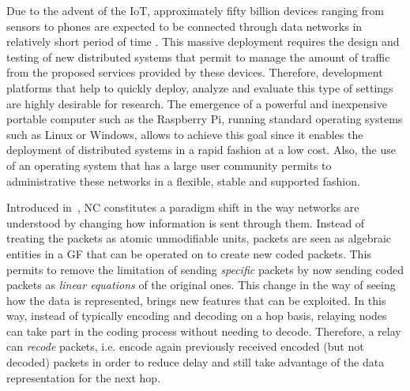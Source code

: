 %

Due to the advent of the \ac{IoT}, approximately fifty billion devices
ranging from sensors to phones are expected to be connected through
data networks in relatively short period of time \cite{cisco2011forecast}.
This massive deployment requires the design and testing of new
distributed systems that permit to manage the amount of traffic
from the proposed services provided by these devices. Therefore,
development platforms that help to quickly deploy, analyze and
evaluate this type of settings are highly desirable for research.
The emergence of a powerful and inexpensive portable computer such
as the Raspberry Pi, running standard operating systems such as
Linux or Windows, allows to achieve this goal since it enables the
deployment of distributed systems in a rapid fashion at a low cost.
Also, the use of an operating system that has a large user community
permits to administrative these networks in a flexible, stable and
supported fashion.

Introduced in~\cite{ahlswede2000network}, \ac{NC}
constitutes a paradigm shift in the way networks are understood
by changing how information is sent through them.
Instead of treating the packets as atomic
unmodifiable units, packets are seen as algebraic entities in a \ac{GF}
that can be operated on to create new coded packets. This permits to
remove the limitation of sending \textit{specific} packets by now sending
coded packets as \textit{linear equations} of the original ones. This
change in the way of seeing how the data is represented, brings new
features that can be exploited. In this way, instead of typically encoding
and decoding on a hop basis, relaying nodes can take part in the
coding process without needing to decode. Therefore, a relay can
\textit{recode} packets, i.e. encode again previously received encoded
(but not decoded) packets in order to reduce delay and still
take advantage of the data representation for the next hop.

